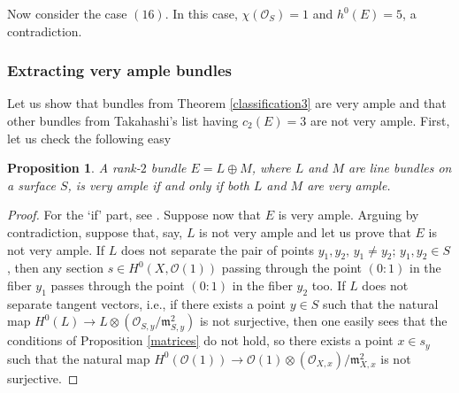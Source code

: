 \documentclass[a4paper]{amsart}
\theoremstyle{plain}
\newtheorem{prop}[theorem]{Proposition}
\theoremstyle{definition}
\begin{document}
Now consider the case $(16)$. In this case, $\chi(\mathcal O_S) = 1$ and $h^0(E) = 5$, a contradiction.
\subsubsection{Extracting very ample bundles}
\label{extraction}
Let us show that bundles from Theorem \ref{classification3} are very ample and that other bundles from Takahashi's list having $c_2(E) = 3$ are not very ample.
First, let us check the following easy
\begin{prop}
    \label{split}
    A rank-$2$ bundle $E = L \oplus M$, where $L$ and $M$ are line bundles on a surface $S$, is very ample if and only if both $L$ and $M$ are very ample.
\end{prop}
\begin{proof}
    For the `if' part, see \cite[Lemma 3.2.3]{adjunction_theory}.
    Suppose now that $E$ is very ample.
    Arguing by contradiction, suppose that, say, $L$ is not very ample and let us prove that $E$ is not very ample.
    If $L$ does not separate the pair of points $y_1, y_2, \, y_1 \neq y_2;\, y_1, y_2 \in S$, then any section $s \in H^0(X, \mathcal O(1))$ passing through the point $(0\colon 1)$ in the fiber $y_1$ passes through the point $(0\colon 1)$ in the fiber $y_2$ too.
    If $L$ does not separate tangent vectors, i.e., if there exists a point $y\in S$ such that the natural map $H^0(L)\to L \otimes (\mathcal O_{S, y}/\mathfrak m_{S,y}^2)$ is not surjective, then one easily sees that the conditions of Proposition \ref{matrices} do not hold,
    so there exists a point $x \in s_y$ such that
    the natural map $H^0(\mathcal O(1)) \to \mathcal O(1)\otimes (\mathcal O_{X, x})/\mathfrak m_{X, x}^2$ is not surjective.
\end{proof}
\end{document}
